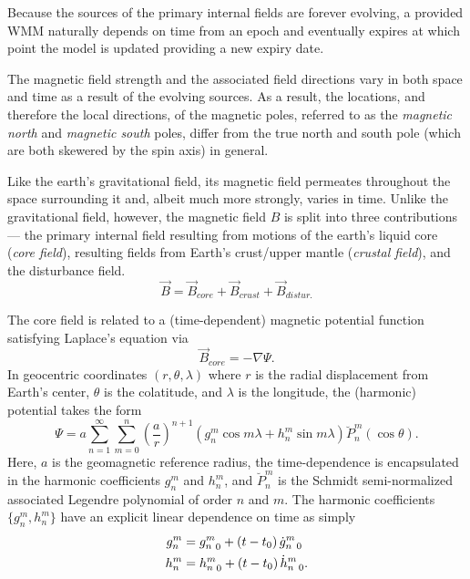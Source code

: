 \documentclass[11pt,dvipsnames]{thesis}
\begin{document}
Because the sources of the primary internal fields are forever evolving, a provided WMM naturally depends on time from an epoch and eventually expires at which point the model is updated providing a new expiry date.

The magnetic field strength and the associated field directions vary in both space and time as a result of the evolving sources. As a result, the locations, and therefore the local directions, of the magnetic poles, referred to as the \textit{magnetic north} and \textit{magnetic south} poles, differ from the true north and south pole (which are both skewered by the spin axis) in general.

Like the earth's gravitational field, its magnetic field permeates throughout the space surrounding it and, albeit much more strongly, varies in time. Unlike the gravitational field, however, the magnetic field $B$ is split into three contributions --- the primary internal field resulting from motions of the earth's liquid core (\textit{core field}), resulting fields from Earth's crust/upper mantle (\textit{crustal field}), and the disturbance field.
\begin{equation}
\vec{B} = \vec{B}_{core} + \vec{B}_{crust} + \vec{B}_{distur.}
\end{equation}

The core field is related to a (time-dependent) magnetic potential function 
satisfying Laplace's equation 
via
\begin{equation}
\vec{B}_{core} = - \nabla \Psi.
\end{equation}
In geocentric coordinates $(r, \theta, \lambda)$ where $r$ is the radial displacement from Earth's center, $\theta$ is the colatitude, and $\lambda$ is the longitude, the (harmonic) potential takes the form
\begin{equation}
\Psi = a \sum_{n = 1}^\infty \sum_{m = 0}^n \left(\frac{a}{r}\right)^{\!n + 1} (g_n^m \cos m\lambda + h_n^m \sin m\lambda) \breve{P}_n^m(\cos\theta).
\end{equation}
Here, $a$ is the geomagnetic reference radius, the time-dependence is encapsulated in the harmonic coefficients $g_n^m$ and $h_n^m$, and $\breve{P}_n^m$ is the Schmidt semi-normalized associated Legendre polynomial of order $n$ and $m$.
The harmonic coefficients $\{g_n^m, h_n^m\}$ have an explicit linear dependence on time as simply
\begin{align}
g_n^m &= {g_n^m}_0 + (t - t_0)\, {\dot{g}_{n\phantom{m}\hspace{-0.33em}0}^m} \\
h_n^m &= {h_n^m}_0 + (t - t_0)\, {\dot{h}_{n\phantom{m}\hspace{-0.33em}0}^m}.
\end{align}
\end{document}
